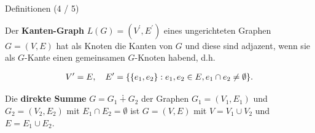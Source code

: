 \documentclass[aspectratio=169]{beamer}
\begin{document}
\begin{frame}{Definitionen (4 / 5)}

    \begin{definition*}

        Der \textbf{Kanten-Graph} $L(G) = (V^\prime, E^\prime)$ eines ungerichteten Graphen $G = (V, E)$ hat als Knoten die Kanten von $G$ und diese sind adjazent, wenn sie als $G$-Kante einen gemeinsamen $G$-Knoten habend, d.h.

        \begin{align*}
            V^\prime = E,
            \quad
            E^\prime = {\left \{ {\left \{ e_1, e_2 \right \}}: e_1, e_2 \in E, e_1 \cap e_2 \neq \emptyset \right \}}.
        \end{align*}

    \end{definition*}

    \begin{definition*}
        Die \textbf{direkte Summe} $G = G_1 \dotplus G_2$ der Graphen $G_1 = (V_1, E_1)$ und $G_2 = (V_2, E_2)$ mit $E_1 \cap E_2 = \emptyset$ ist $G = (V, E)$ mit $V = V_1 \cup V_2$ und $E = E_1 \cup E_2$.
    \end{definition*}

\end{frame}

\end{document}
